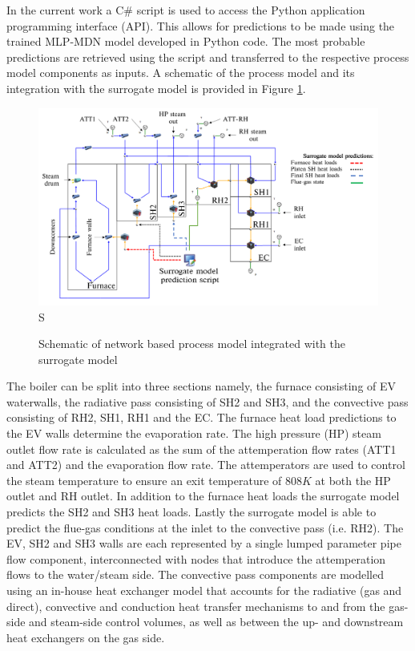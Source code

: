 \documentclass[a4paper,fleqn]{cas-dc}
\begin{document}
In the current work a C\# script is used to access the Python application programming interface (API). This allows for predictions to be made using the trained MLP-MDN model developed in Python code. The most probable predictions are retrieved using the script and transferred to the respective process model components as inputs. A schematic of the process model and its integration with the surrogate model is provided in Figure \ref{fig_int_model}.\\
\begin{figure}[h!]
	\centering
		\includegraphics[scale=0.15]{INTEGRATED_MODEL}S
	  \caption{Schematic of network based process model integrated with the surrogate model}\label{fig_int_model}
\end{figure}

The boiler can be split into three sections namely, the furnace consisting of EV waterwalls, the radiative pass consisting of SH2 and SH3, and the convective pass consisting of RH2, SH1, RH1 and the EC. The furnace heat load predictions to the EV walls determine the evaporation rate. The high pressure (HP) steam outlet flow rate is calculated as the sum of the attemperation flow rates (ATT1 and ATT2) and the evaporation flow rate. The attemperators are used to control the steam temperature to ensure an exit temperature of $808K$ at both the HP outlet and RH outlet. In addition to the furnace heat loads the surrogate model predicts the SH2 and SH3 heat loads. Lastly the surrogate model is able to predict the flue-gas conditions at the inlet to the convective pass (i.e. RH2). The EV, SH2 and SH3 walls are each represented by a single lumped parameter pipe flow component, interconnected with nodes that introduce the attemperation flows to the water/steam side. The convective pass components are modelled using an in-house heat exchanger model that accounts for the radiative (gas and direct), convective and conduction heat transfer mechanisms to and from the gas-side and steam-side control volumes, as well as between the up- and downstream heat exchangers on the gas side.
\end{document}
